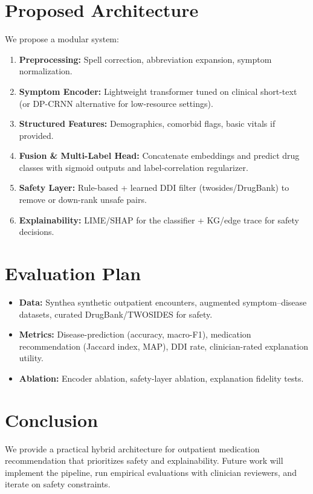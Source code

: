 \documentclass[conference,onecolumn]{IEEEtran}
\begin{document}
\section{Proposed Architecture}
We propose a modular system:
\begin{enumerate}
\item \textbf{Preprocessing:} Spell correction, abbreviation expansion, symptom normalization.
\item \textbf{Symptom Encoder:} Lightweight transformer tuned on clinical short-text (or DP-CRNN alternative for low-resource settings).
\item \textbf{Structured Features:} Demographics, comorbid flags, basic vitals if provided.
\item \textbf{Fusion \& Multi-Label Head:} Concatenate embeddings and predict drug classes with sigmoid outputs and label-correlation regularizer.
\item \textbf{Safety Layer:} Rule-based + learned DDI filter (twosides/DrugBank) to remove or down-rank unsafe pairs.
\item \textbf{Explainability:} LIME/SHAP for the classifier + KG/edge trace for safety decisions.
\end{enumerate}



\section{Evaluation Plan}
\begin{itemize}
\item \textbf{Data:} Synthea synthetic outpatient encounters, augmented symptom–disease datasets, curated DrugBank/TWOSIDES for safety.
\item \textbf{Metrics:} Disease-prediction (accuracy, macro-F1), medication recommendation (Jaccard index, MAP), DDI rate, clinician-rated explanation utility.
\item \textbf{Ablation:} Encoder ablation, safety-layer ablation, explanation fidelity tests.
\end{itemize}

\section{Conclusion}
We provide a practical hybrid architecture for outpatient medication recommendation that prioritizes safety and explainability. Future work will implement the pipeline, run empirical evaluations with clinician reviewers, and iterate on safety constraints.
\end{document}
